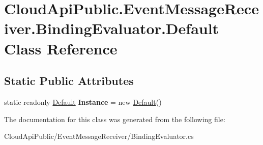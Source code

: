\hypertarget{class_cloud_api_public_1_1_event_message_receiver_1_1_binding_evaluator_1_1_default}{\section{Cloud\-Api\-Public.\-Event\-Message\-Receiver.\-Binding\-Evaluator.\-Default Class Reference}
\label{class_cloud_api_public_1_1_event_message_receiver_1_1_binding_evaluator_1_1_default}
}
\subsection*{Static Public Attributes}
\begin{DoxyCompactItemize}
\item 
\hypertarget{class_cloud_api_public_1_1_event_message_receiver_1_1_binding_evaluator_1_1_default_a0167c60f137087cb60ad6a186f325ae2}{static readonly \hyperlink{class_cloud_api_public_1_1_event_message_receiver_1_1_binding_evaluator_1_1_default}{Default} {\bfseries Instance} = new \hyperlink{class_cloud_api_public_1_1_event_message_receiver_1_1_binding_evaluator_1_1_default}{Default}()}\label{class_cloud_api_public_1_1_event_message_receiver_1_1_binding_evaluator_1_1_default_a0167c60f137087cb60ad6a186f325ae2}

\end{DoxyCompactItemize}


The documentation for this class was generated from the following file\-:\begin{DoxyCompactItemize}
\item 
Cloud\-Api\-Public/\-Event\-Message\-Receiver/Binding\-Evaluator.\-cs\end{DoxyCompactItemize}
